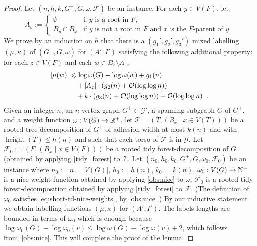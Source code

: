 \documentclass{patmorin}
\let\eqref\cref
\renewcommand{\le}{\leqslant}
\renewcommand{\leq}{\leqslant}
\DeclareMathOperator{\height}{height}
\newcommand{\Oh}{\mathcal{O}}
\begin{document}
\begin{proof}
    Let $(n,h,k,G^+,G,\omega,\mathcal{F})$ be an instance.
    For each $y\in V(F)$, let
    \[
    A_y:=\begin{cases}
        \emptyset&\textrm{if $y$ is a root in $F$,}\\
        B_y\cap B_x&\textrm{if $y$ is not a root in $F$ and $x$ is the $F$-parent of $y$.}
    \end{cases}
    \]
    We prove by an induction on $h$ that there is a $(g_1',g_2',g_3')$ mixed labelling $(\mu,\kappa)$ of $(G^+,G,\omega)$ for $(A',I')$ satisfying the following additional property: for each $z\in V(F)$ and each $w\in B_z\setminus A_z$,
    \begin{align}
       |\mu(w)|
       & \le \log \omega(G) - \log \omega(w) + g_1(n)\notag\\
       & \quad {} + |A_z|\cdot (g_2(n) + \Oh(\log\log n))\label{strong_strong} \\
       & \quad {} + h\cdot(g_3(n) + \Oh(\log\log n)) + \Oh(\log\log n)\enspace.\notag
    \end{align}
    Given an integer $n$, an $n$-vertex graph $G^+\in\mathcal{G}'$, a spanning subgraph $G$ of $G^+$, and a weight function $\omega:V(G)\to\mathbb{R}^+$, let $\mathcal{T}=(T,(B_x \mid x\in V(T)))$ be a rooted tree-decomposition of $G^+$ of adhesion-width at most $k(n)$ and with $\height(T)\leq h(n)$ and such that each torso of $\mathcal{F}$ is in $\mathcal{G}$. Let $\mathcal{F}_0:=(F,(B_x \mid x\in V(F)))$ be a rooted tidy forest-decomposition of $G^+$ (obtained by applying \cref{tidy_forest} to $\mathcal{T}$.  Let $(n_0,h_0,k_0,G^+,G,\omega_0,\mathcal{F}_0)$ be an instance where $n_0:=n=|V(G)|$, $h_0:=h(n)$, $k_0:=k(n)$, $\omega_0:V(G)\to\mathbb{N}^+$ is a nice weight function obtained by applying \cref{obs:nice} to $\omega$, $\mathcal{F}_0$ is a rooted tidy forest-decomposition obtained by applying \cref{tidy_forest} to $\mathcal{F}$.  (The definition of $\omega_0$ satisfies \eqref{eq:short-td-nice-weights}, by \cref{obs:nice}.)
    By our inductive statement we obtain labelling functions $(\mu,\kappa)$ for $(A',I')$.
    The labels lengths are bounded in terms of $\omega_0$ which is enough because $\log\omega_0(G) - \log\omega_0(v) \leq \log\omega(G)-\log\omega(v)+2$, which follows from~\cref{obs:nice}.
    This will complete the proof of the lemma.


\end{proof}
\end{document}
